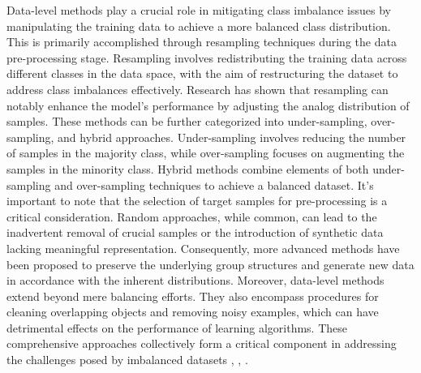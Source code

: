 Data-level methods play a crucial role in mitigating class imbalance issues by manipulating the training data to achieve a more balanced class distribution. This is primarily accomplished through resampling techniques during the data pre-processing stage. Resampling involves redistributing the training data across different classes in the data space, with the aim of restructuring the dataset to address class imbalances effectively. Research has shown that resampling can notably enhance the model's performance by adjusting the analog distribution of samples. 
These methods can be further categorized into under-sampling, over-sampling, and hybrid approaches. Under-sampling involves reducing the number of samples in the majority class, while over-sampling focuses on augmenting the samples in the minority class. Hybrid methods combine elements of both under-sampling and over-sampling techniques to achieve a balanced dataset. It's important to note that the selection of target samples for pre-processing is a critical consideration. Random approaches, while common, can lead to the inadvertent removal of crucial samples or the introduction of synthetic data lacking meaningful representation. Consequently, more advanced methods have been proposed to preserve the underlying group structures and generate new data in accordance with the inherent distributions.
Moreover, data-level methods extend beyond mere balancing efforts. They also encompass procedures for cleaning overlapping objects and removing noisy examples, which can have detrimental effects on the performance of learning algorithms. These comprehensive approaches collectively form a critical component in addressing the challenges posed by imbalanced datasets \cite{Krawczyk2016}, \cite{Fotouhi2019}, \cite{Khushi2021}. 

